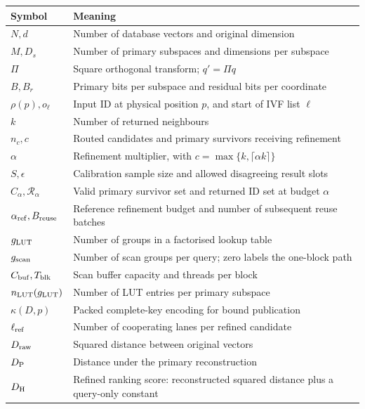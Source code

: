 \begingroup\small{}
\begin{longtable}{@{}>{\raggedright\arraybackslash}p{.25\linewidth}>{\raggedright\arraybackslash}p{.70\linewidth}@{}}
\toprule
Symbol & Meaning \\
\midrule
$N,d$ & Number of database vectors and original dimension \\
$M,D_s$ & Number of primary subspaces and dimensions per subspace \\
$\Pi$ & Square orthogonal transform; $q'=\Pi q$ \\
$B,B_r$ & Primary bits per subspace and residual bits per coordinate \\
$\rho(p),o_\ell$ & Input ID at physical position $p$, and start of IVF list $\ell$ \\
$k$ & Number of returned neighbours \\
$n_c,c$ & Routed candidates and primary survivors receiving refinement \\
$\alpha$ & Refinement multiplier, with $c=\max\{k,\lceil\alpha k\rceil\}$ \\
$S,\epsilon$ & Calibration sample size and allowed disagreeing result slots \\
$C_\alpha,\mathcal R_\alpha$ & Valid primary survivor set and returned ID set at budget $\alpha$ \\
$\alpha_{\rm ref},B_{\rm reuse}$ & Reference refinement budget and number of subsequent reuse batches \\
$g_{\mathrm{LUT}}$ & Number of groups in a factorised lookup table \\
$g_{\mathrm{scan}}$ & Number of scan groups per query; zero labels the one-block path \\
$C_{\rm buf},T_{\rm blk}$ & Scan buffer capacity and threads per block \\
$n_{\rm LUT}(g_{\mathrm{LUT}})$ & Number of LUT entries per primary subspace \\
$\kappa(D,p)$ & Packed complete-key encoding for bound publication \\
$\ell_{\mathrm{ref}}$ & Number of cooperating lanes per refined candidate \\
$D_{\mathrm{raw}}$ & Squared distance between original vectors \\
$D_{\mathrm{P}}$ & Distance under the primary reconstruction \\
$D_{\mathrm{H}}$ & Refined ranking score: reconstructed squared distance plus a query-only constant \\
\bottomrule
\end{longtable}

